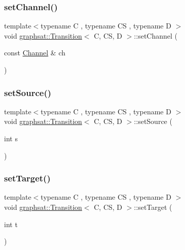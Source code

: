 \subsubsection{\texorpdfstring{setChannel()}{setChannel()}}
{\footnotesize\ttfamily template$<$typename C , typename CS , typename D $>$ \\
void \mbox{\hyperlink{classgraphsat_1_1_transition}{graphsat\+::\+Transition}}$<$ C, CS, D $>$\+::set\+Channel (\begin{DoxyParamCaption}\item[{const \mbox{\hyperlink{structgraphsat_1_1_channel}{Channel}} \&}]{ch }\end{DoxyParamCaption})\hspace{0.3cm}{\ttfamily [inline]}}

\mbox{\label{classgraphsat_1_1_transition_a72ba2eeb745e6d72761cfbeb01135d3b}} 
\subsubsection{\texorpdfstring{setSource()}{setSource()}}
{\footnotesize\ttfamily template$<$typename C , typename CS , typename D $>$ \\
void \mbox{\hyperlink{classgraphsat_1_1_transition}{graphsat\+::\+Transition}}$<$ C, CS, D $>$\+::set\+Source (\begin{DoxyParamCaption}\item[{int}]{s }\end{DoxyParamCaption})\hspace{0.3cm}{\ttfamily [inline]}}

\mbox{\label{classgraphsat_1_1_transition_a8e5c7d83133796e972dec30b2710505e}} 
\subsubsection{\texorpdfstring{setTarget()}{setTarget()}}
{\footnotesize\ttfamily template$<$typename C , typename CS , typename D $>$ \\
void \mbox{\hyperlink{classgraphsat_1_1_transition}{graphsat\+::\+Transition}}$<$ C, CS, D $>$\+::set\+Target (\begin{DoxyParamCaption}\item[{int}]{t }\end{DoxyParamCaption})\hspace{0.3cm}{\ttfamily [inline]}}




